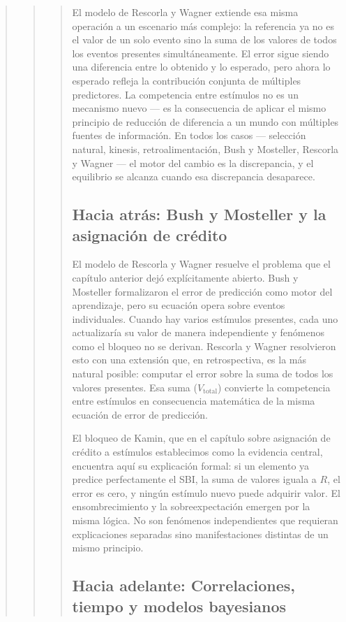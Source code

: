 \documentclass[
  letterpaper,
  DIV=11,
  numbers=noendperiod]{scrreprt}
\begin{document}
\begin{tcolorbox}[enhanced jigsaw, arc=.35mm, bottomrule=.15mm, breakable, colback=white, colframe=quarto-callout-note-color-frame, left=2mm, leftrule=.75mm, opacityback=0, rightrule=.15mm, toprule=.15mm]
\begin{quote}
\begin{quote}
\begin{quote}
El modelo de Rescorla y Wagner extiende esa misma operación a un
escenario más complejo: la referencia ya no es el valor de un solo
evento sino la suma de los valores de todos los eventos presentes
simultáneamente. El error sigue siendo una diferencia entre lo obtenido
y lo esperado, pero ahora lo esperado refleja la contribución conjunta
de múltiples predictores. La competencia entre estímulos no es un
mecanismo nuevo --- es la consecuencia de aplicar el mismo principio de
reducción de diferencia a un mundo con múltiples fuentes de información.
En todos los casos --- selección natural, kinesis, retroalimentación,
Bush y Mosteller, Rescorla y Wagner --- el motor del cambio es la
discrepancia, y el equilibrio se alcanza cuando esa discrepancia
desaparece.

\mbox{}%
\subsection{Hacia atrás: Bush y Mosteller y la asignación de
crédito}\label{hacia-atruxe1s-bush-y-mosteller-y-la-asignaciuxf3n-de-cruxe9dito}

El modelo de Rescorla y Wagner resuelve el problema que el capítulo
anterior dejó explícitamente abierto. Bush y Mosteller formalizaron el
error de predicción como motor del aprendizaje, pero su ecuación opera
sobre eventos individuales. Cuando hay varios estímulos presentes, cada
uno actualizaría su valor de manera independiente y fenómenos como el
bloqueo no se derivan. Rescorla y Wagner resolvieron esto con una
extensión que, en retrospectiva, es la más natural posible: computar el
error sobre la suma de todos los valores presentes. Esa suma
(\(V_{\text{total}}\)) convierte la competencia entre estímulos en
consecuencia matemática de la misma ecuación de error de predicción.

El bloqueo de Kamin, que en el capítulo sobre asignación de crédito a
estímulos establecimos como la evidencia central, encuentra aquí su
explicación formal: si un elemento ya predice perfectamente el SBI, la
suma de valores iguala a \(R\), el error es cero, y ningún estímulo
nuevo puede adquirir valor. El ensombrecimiento y la sobreexpectación
emergen por la misma lógica. No son fenómenos independientes que
requieran explicaciones separadas sino manifestaciones distintas de un
mismo principio.

\mbox{}%
\subsection{Hacia adelante: Correlaciones, tiempo y modelos
bayesianos}\label{hacia-adelante-correlaciones-tiempo-y-modelos-bayesianos}


\end{quote}
\end{quote}
\end{quote}
\end{tcolorbox}
\end{document}
